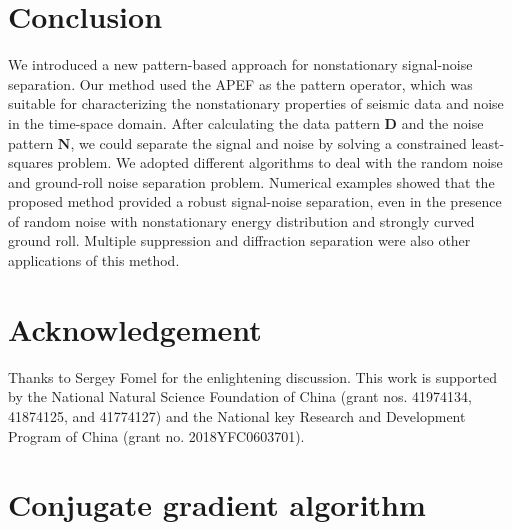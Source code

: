 \section{Conclusion}
We introduced a new pattern-based approach for nonstationary signal-noise
separation. Our method used the APEF as the pattern operator, which was suitable
for characterizing the nonstationary properties of seismic data and noise
in the time-space domain. After calculating the data pattern $\mathbf{D}$ and
the noise pattern $\mathbf{N}$, we could separate the signal and noise by solving
a constrained least-squares problem. We adopted different algorithms to deal
with the random noise and ground-roll noise separation problem. Numerical examples
showed that the proposed method provided a robust signal-noise separation,
even in the presence of random noise with nonstationary energy distribution and
strongly curved ground roll. Multiple suppression and diffraction separation were
also other applications of this method.


\section{Acknowledgement}
Thanks to Sergey Fomel for the enlightening discussion. This work is supported
by the National Natural Science Foundation of China (grant nos. 41974134, 41874125,
and 41774127) and the National key Research and Development Program of China
(grant no. 2018YFC0603701).

\appendix
\section{Conjugate gradient algorithm}

